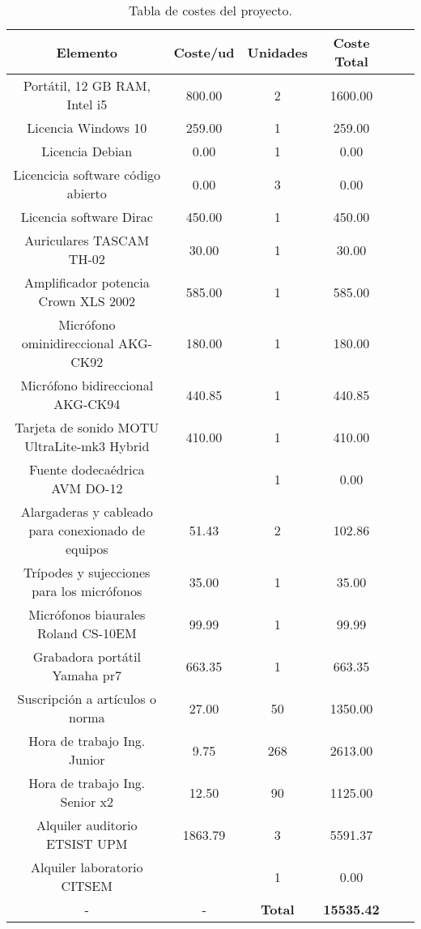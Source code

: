 \documentclass[11pt,a4paper,twoside]{book}
\begin{document}
        \begin{table}[H]
			\begin{center}
			\begin{scriptsize}
			\begin{tabular}{| c || c | c | c | c | c |}
				\hline
				\textbf{Elemento}&\textbf{Coste/ud}&\textbf{Unidades}&\textbf{Coste Total}\\ \hline
                Portátil, 12 GB RAM, Intel i5&800.00&2&1600.00\\ \hline
                Licencia Windows 10&259.00&1&259.00\\ \hline
                Licencia Debian&0.00&1&0.00\\ \hline
                Licencicia software código abierto&0.00&3&0.00\\ \hline
                Licencia software Dirac&450.00&1&450.00\\ \hline
                Auriculares TASCAM TH-02&30.00&1&30.00\\ \hline
                Amplificador potencia Crown XLS 2002&585.00&1&585.00\\ \hline
                Micrófono ominidireccional AKG-CK92&180.00&1&180.00\\ \hline
                Micrófono bidireccional AKG-CK94&440.85&1&440.85\\ \hline
                Tarjeta de sonido MOTU UltraLite-mk3 Hybrid&410.00&1&410.00\\ \hline
                Fuente dodecaédrica AVM DO-12&&1&0.00\\ \hline
                Alargaderas y cableado para conexionado de equipos&51.43&2&102.86\\ \hline
                Trípodes y sujecciones para los micrófonos&35.00&1&35.00\\ \hline
                Micrófonos biaurales Roland CS-10EM&99.99&1&99.99\\ \hline
                Grabadora portátil Yamaha pr7&663.35&1&663.35\\ \hline
                Suscripción a artículos o norma&27.00&50&1350.00\\ \hline
                Hora de trabajo Ing. Junior&9.75&268&2613.00\\ \hline
                Hora de trabajo Ing. Senior x2&12.50&90&1125.00\\ \hline
                Alquiler auditorio ETSIST UPM&1863.79&3&5591.37\\ \hline
                Alquiler laboratorio CITSEM&&1&0.00\\ \hline
                -&-&\textbf{Total}&\textbf{15535.42}\\ \hline
        
            \end{tabular}
			\caption{Tabla de costes del proyecto.}
			\label{table:tablaPresupuesto}
			\end{scriptsize}
			\end{center}	
		\end{table}
\end{document}
